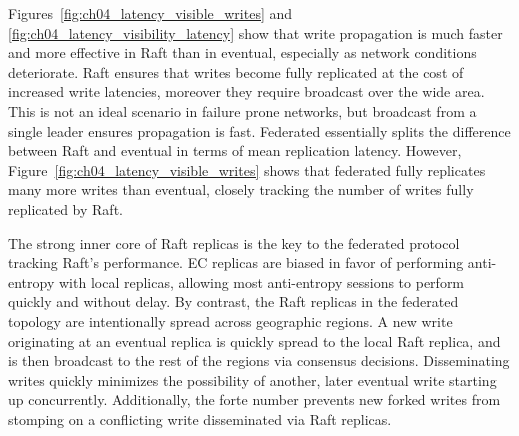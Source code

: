 Figures~\ref{fig:ch04_latency_visible_writes} and \ref{fig:ch04_latency_visibility_latency} show that write propagation is much faster and more effective in Raft than in eventual, especially as network conditions deteriorate.
Raft ensures that writes become fully replicated at the cost of increased write latencies, moreover they require broadcast over the wide area.
This is not an ideal scenario in failure prone networks, but broadcast from a single leader ensures propagation is fast.
Federated essentially splits the difference between Raft and eventual in terms of mean replication latency.
However, Figure~\ref{fig:ch04_latency_visible_writes} shows that federated fully replicates many more writes than eventual, closely tracking the number of writes fully replicated by Raft.

The strong inner core of Raft replicas is the key to the federated protocol tracking Raft's performance.
EC replicas are biased in favor of performing anti-entropy with local replicas, allowing most anti-entropy sessions to perform quickly and without delay.
By contrast, the Raft replicas in the federated topology are intentionally spread across geographic regions.
A new write originating at an eventual replica is quickly spread to the local
Raft replica, and is then broadcast to the rest of the regions via consensus decisions.
Disseminating writes quickly minimizes the possibility of another, later
eventual write starting up concurrently.
Additionally, the forte number prevents new forked writes from stomping on a
conflicting write disseminated via Raft replicas.

